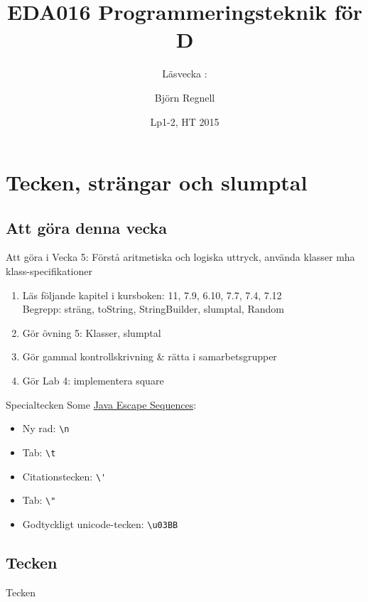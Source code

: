 \documentclass{lecturenotes}
\title[Föreläsningsanteckningar EDA016, 2015]{EDA016 Programmeringsteknik för D}
\subtitle{Läsvecka \vecka: \tema}
\author{Björn Regnell}
\institute{Datavetenskap, LTH}
\date{Lp1-2, HT 2015}
\renewcommand{\vecka}{5}
\newcommand{\tema}{Tecken, strängar och slumptal}
\begin{document}
\frame{\titlepage}
\setnextsection{\vecka}
\section[Vecka \vecka: \tema]{\tema}
\frame{\tableofcontents}


\subsection{Att göra denna vecka}
\begin{Slide}{Att göra i Vecka \vecka: Förstå aritmetiska och logiska uttryck, använda klasser mha klass-specifikationer}
\begin{enumerate}
\item Läs följande kapitel i kursboken: 11, 7.9, 6.10, 7.7, 7.4, 7.12 \\  
Begrepp: sträng, toString, StringBuilder, slumptal, Random
\item Gör övning 5: Klasser, slumptal
\item Gör gammal kontrollskrivning \& rätta i samarbetsgrupper 
\item Gör Lab 4: implementera square
\end{enumerate}
\end{Slide}

\begin{Slide}{Specialtecken}
Some \href{https://docs.oracle.com/javase/tutorial/java/data/characters.html}{Java Escape Sequences}:
\begin{itemize}
\item Ny rad: \verb+\n+
\item Tab: \verb+\t+
\item Citationstecken: \verb+\'+
\item Tab: \verb+\"+
\item Godtyckligt unicode-tecken:  \verb+\u03BB+ 
\end{itemize}
\end{Slide}

\subsection{Tecken}
\begin{Slide}{Tecken}

\end{Slide}
\end{document}
